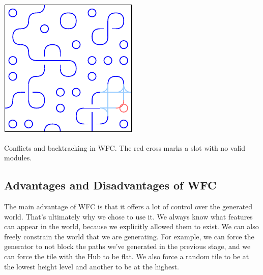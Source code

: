 \begin{center}
\begin{minipage}{.31\textwidth}
         \label{fig:wfc-dead-end}
    \end{minipage}%
    \begin{minipage}{.31\textwidth}
        \centering
        \includegraphics[width=0.95\linewidth]{img/WFC backtracking after.pdf}
         \label{fig:wfc-after-backtracking}
    \end{minipage}
    \caption{Conflicts and backtracking in WFC. The red cross marks a slot with no valid modules.}
    \label{fig:wfc-backtracking}
\end{center}

\subsection{Advantages and Disadvantages of WFC}

The main advantage of WFC is that it offers a lot of control over the generated world.
That's ultimately why we chose to use it.
We always know what features can appear in the world, because we explicitly allowed them to exist.
We can also freely constrain the world that we are generating.
For example, we can force the generator to not block the paths we've generated in the previous stage, and we can force the tile with the Hub to be flat.
We also force a random tile to be at the lowest height level and another to be at the highest.

